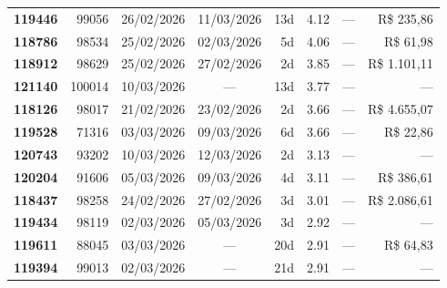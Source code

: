 \documentclass[a4paper,10pt]{article}
\begin{document}
\begin{center}
\begin{longtable}{>{\scriptsize}r>{\scriptsize}r>{\scriptsize}c>{\scriptsize}c>{\scriptsize}r>{\scriptsize}r>{\scriptsize}r>{\scriptsize}r}
\textcolor{anomorange}{\textbf{119446}} & 99056 & 26/02/2026 & 11/03/2026 & 13d & \textcolor{anomorange}{4.12} & --- & \textcolor{anomred}{R\$ 235,86} \\

\textcolor{anomorange}{\textbf{118786}} & 98534 & 25/02/2026 & 02/03/2026 & 5d & \textcolor{anomorange}{4.06} & --- & \textcolor{anomred}{R\$ 61,98} \\

\textcolor{anomorange}{\textbf{118912}} & 98629 & 25/02/2026 & 27/02/2026 & 2d & \textcolor{anomorange}{3.85} & --- & \textcolor{anomred}{R\$ 1.101,11} \\

\textcolor{anomorange}{\textbf{121140}} & 100014 & 10/03/2026 & — & 13d & \textcolor{anomorange}{3.77} & --- & --- \\

\textcolor{anomorange}{\textbf{118126}} & 98017 & 21/02/2026 & 23/02/2026 & 2d & \textcolor{anomorange}{3.66} & --- & \textcolor{anomred}{R\$ 4.655,07} \\

\textcolor{anomorange}{\textbf{119528}} & 71316 & 03/03/2026 & 09/03/2026 & 6d & \textcolor{anomorange}{3.66} & --- & \textcolor{anomred}{R\$ 22,86} \\

\textcolor{anomorange}{\textbf{120743}} & 93202 & 10/03/2026 & 12/03/2026 & 2d & \textcolor{anomorange}{3.13} & --- & --- \\

\textcolor{anomorange}{\textbf{120204}} & 91606 & 05/03/2026 & 09/03/2026 & 4d & \textcolor{anomorange}{3.11} & --- & \textcolor{anomred}{R\$ 386,61} \\

\textcolor{anomorange}{\textbf{118437}} & 98258 & 24/02/2026 & 27/02/2026 & 3d & \textcolor{anomorange}{3.01} & --- & \textcolor{anomred}{R\$ 2.086,61} \\

\textcolor{anomyellow}{\textbf{119434}} & 98119 & 02/03/2026 & 05/03/2026 & 3d & \textcolor{anomyellow}{2.92} & --- & --- \\

\textcolor{anomyellow}{\textbf{119611}} & 88045 & 03/03/2026 & — & 20d & \textcolor{anomyellow}{2.91} & --- & \textcolor{anomred}{R\$ 64,83} \\

\textcolor{anomyellow}{\textbf{119394}} & 99013 & 02/03/2026 & — & 21d & \textcolor{anomyellow}{2.91} & --- & --- \\


\end{longtable}
\end{center}
\end{document}
